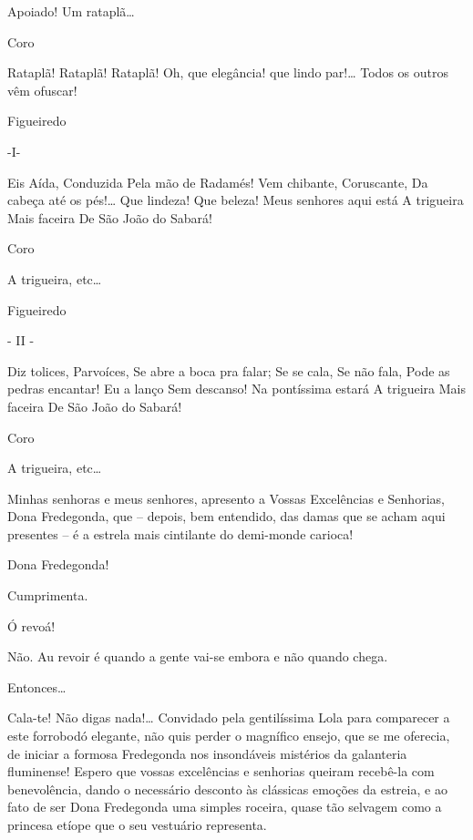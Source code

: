  Apoiado! Um rataplã\ldots{} 

 Coro

 Rataplã! Rataplã! Rataplã!
 Oh, que elegância! que lindo par!\ldots{}
 Todos os outros vêm ofuscar!



 Figueiredo

 -I-

 Eis Aída,
 Conduzida
 Pela mão de Radamés!
 Vem chibante,
 Coruscante,
 Da cabeça até os pés!\ldots{}
 Que lindeza!
 Que beleza!
 Meus senhores aqui está
 A trigueira
 Mais faceira
 De São João do Sabará!

 Coro

 A trigueira, etc\ldots{}

 Figueiredo

 - II -

 Diz tolices,
 Parvoíces,
 Se abre a boca pra falar;
 Se se cala,
 Se não fala,
 Pode as pedras encantar!
 Eu a lanço
 Sem descanso!
 Na pontíssima estará
 A trigueira
 Mais faceira
 De São João do Sabará!

 Coro

 A trigueira, etc\ldots{}

 Minhas senhoras e meus senhores, apresento a Vossas
Excelências e Senhorias, Dona Fredegonda, que -- depois, bem entendido, das damas que se
acham aqui presentes -- é a estrela mais cintilante do demi-monde carioca!

  Dona Fredegonda!

  Cumprimenta.

 Ó revoá!

  Não. Au revoir é quando a gente vai-se embora e não
quando chega.

 Entonces\ldots{}

  Cala-te! Não digas nada!\ldots{}  Convidado pela
gentilíssima Lola para comparecer a este forrobodó elegante, não quis
perder o magnífico ensejo, que se me oferecia, de iniciar a formosa Fredegonda nos
insondáveis mistérios da galanteria fluminense! Espero que vossas
excelências e senhorias queiram recebê-la com benevolência, dando o necessário desconto
às clássicas emoções da estreia, e ao fato de ser Dona Fredegonda uma simples
roceira, quase tão selvagem como a princesa etíope que o seu vestuário
representa.

